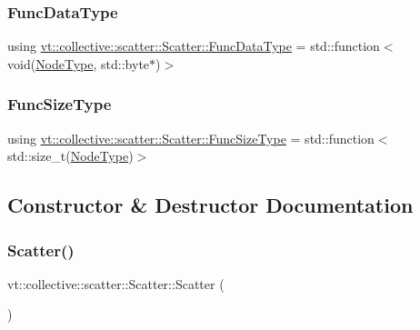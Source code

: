 \subsubsection{\texorpdfstring{Func\+Data\+Type}{FuncDataType}}
{\footnotesize\ttfamily using \hyperlink{structvt_1_1collective_1_1scatter_1_1_scatter_a19da1fe0f7347a8e91f08b6a19fee781}{vt\+::collective\+::scatter\+::\+Scatter\+::\+Func\+Data\+Type} =  std\+::function$<$void(\hyperlink{namespacevt_a866da9d0efc19c0a1ce79e9e492f47e2}{Node\+Type}, std\+::byte$\ast$)$>$}

\mbox{\label{structvt_1_1collective_1_1scatter_1_1_scatter_a977d895e42999a4078c6705ac851f447}} 
\subsubsection{\texorpdfstring{Func\+Size\+Type}{FuncSizeType}}
{\footnotesize\ttfamily using \hyperlink{structvt_1_1collective_1_1scatter_1_1_scatter_a977d895e42999a4078c6705ac851f447}{vt\+::collective\+::scatter\+::\+Scatter\+::\+Func\+Size\+Type} =  std\+::function$<$std\+::size\+\_\+t(\hyperlink{namespacevt_a866da9d0efc19c0a1ce79e9e492f47e2}{Node\+Type})$>$}



\subsection{Constructor \& Destructor Documentation}
\mbox{\label{structvt_1_1collective_1_1scatter_1_1_scatter_a33ea9a78c5d43dcea4ec2cb69d8b00b4}} 
\subsubsection{\texorpdfstring{Scatter()}{Scatter()}}
{\footnotesize\ttfamily vt\+::collective\+::scatter\+::\+Scatter\+::\+Scatter (\begin{DoxyParamCaption}{ }\end{DoxyParamCaption})}



